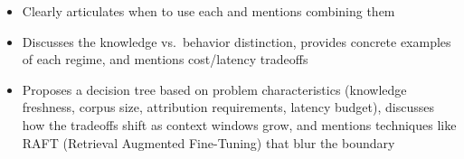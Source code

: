 \begin{interviewq}
\goodgreat
\begin{itemize}
    \item {} Clearly articulates when to use each and mentions combining them
    \item {} Discusses the knowledge vs.\ behavior distinction, provides
          concrete examples of each regime, and mentions cost/latency tradeoffs
    \item {} Proposes a decision tree based on problem characteristics
          (knowledge freshness, corpus size, attribution requirements, latency budget),
          discusses how the tradeoffs shift as context windows grow, and mentions
          techniques like RAFT (Retrieval Augmented Fine-Tuning) that blur the boundary
\end{itemize}

\end{interviewq}

\bigskip

